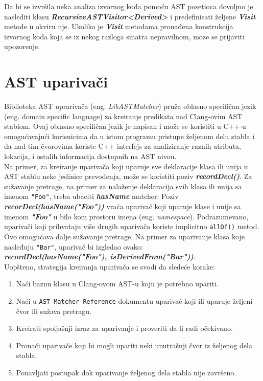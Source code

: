 \documentclass[12pt,oneside]{memoir}
\begin{document}
\par
Da bi se izvršila neka analiza izvornog koda pomoću AST posetioca dovoljno je naslediti klasu 
 \textbf{\textit{RecursiveASTVisitor<Derived>}} i predefinisati željene \textbf{\textit{Visit}} metode u okviru nje. Ukoliko je \textbf{\textit{Visit}} metodama pronađena konstrukcija izvornog koda koja se iz nekog razloga smatra nepravilnom, moze se prijaviti upozorenje.
\section{AST upariva\v{c}i}
Biblioteka AST uprariva\v{c}a (eng. \textit{LibASTMatcher}) pruža oblasno specifičan jezik (eng. domain specific language) za kreiranje predikata nad Clang-ovim AST stablom. Ovaj oblasno specifičan jezik je napisan i može se koristiti u C++-u omogućavajući korisnicima da u istom programu pristupe željenom delu stabla i da nad tim čvorovima koriste C++ interfejs za analiziranje raznih atributa, lokacija, i ostalih informacija dostupnih na AST nivou.
\\ Na primer, za kreiranje upariva\v{c}a koji uparuje sve deklaracije klasa ili unija u AST stablu neke jedinice prevođenja, može se koristiti poziv \textbf{\textit{recordDecl()}}. Za sužavanje pretrage, na primer za nalaženje deklaracija svih klasa ili unija sa imenom \texttt{"Foo"}, treba ubaciti \textbf{\textit{hasName}} matcher: Poziv \textbf{\textit{recorDecl(hasName("Foo"))}} vraća upariva\v{c} koji uparuje klase i unije sa imenom \textbf{\textit{"Foo"}} u bilo kom prostoru imena (eng. \textit{namespace}). Podrazumevano, upariva\v{c}i koji prihvataju više drugih upariva\v{c}a koriste implicitno \texttt{allOf()} metod. Ovo omogućava dalje sužavanje pretrage. Na primer za uparivanje klasa koje nasleđuju \texttt{"Bar"}, upariva\v{c} bi izgledao ovako: \\  \textbf{\textit{recordDecl(hasName("Foo"), isDerivedFrom("Bar"))}}.
\\

Uopšteno, strategija kreiranja upariva\v{c}a se svodi da sledeće korake:
\begin{enumerate}
\item Na\'{c}i baznu klasu u Clang-ovom AST-u koju je potrebno upariti.
 
\item Na\'{c}i u \texttt{AST Matcher Reference} dokumentu upariva\v{c} koji ili uparuje \v{z}eljeni čvor ili su\v{z}ava pretragu.
\item Kreirati spoljašnji izraz za uparivanje i proveriti da li radi o\v{c}ekivano.
\item Prona\'{c}i upariva\v{c}e koji bi mogli upariti neki unutrašnji čvor iz željenog dela stabla.
\item Ponavljati postupak dok uparivanje željenog dela stabla nije završeno.
\end{enumerate}
\end{document}

